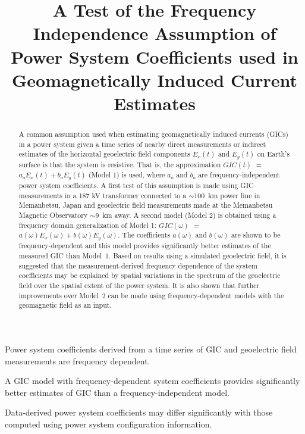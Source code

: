 \documentclass[draft,linenumbers]{agujournal2018}
\begin{document}
\title{A Test of the Frequency Independence Assumption of Power System Coefficients used in Geomagnetically Induced Current Estimates}





\begin{keypoints}
\item Power system coefficients derived from a time series of GIC and geoelectric field measurements are frequency dependent.
\item A GIC model with frequency-dependent system coefficients provides significantly better estimates of GIC than a frequency-independent model.
\item Data-derived power system coefficients may differ significantly with those computed using power system configuration information.
\end{keypoints}

\begin{abstract}
  A common assumption used when estimating geomagnetically induced currents (GICs) in a power system given a time series of nearby direct measurements or indirect estimates of the horizontal geoelectric field components $E_x(t)$ and $E_y(t)$ on Earth's surface is that the system is resistive. That is, the approximation $GIC(t)$  $=$ $a_oE_x(t) + b_oE_y(t)$ (Model 1) is used, where $a_o$ and $b_o$ are frequency-independent power system coefficients.  A first test of this assumption is made using GIC measurements in a 187 kV transformer connected to a $\sim$100~km power line in Memanbetsu, Japan and geoelectric field measurements made at the Memanbetsu Magnetic Observatory $\sim$9~km away. A second model (Model 2) is obtained using a frequency domain generalization of Model 1: $GIC(\omega)$ $=$ $a(\omega)E_x(\omega) + b(\omega)E_y(\omega)$. The coefficients $a(\omega)$ and $b(\omega)$ are shown to be frequency-dependent and this model provides significantly better estimates of the measured GIC than Model~1. Based on results using a simulated geoelectric field, it is suggested that the measurement-derived frequency dependence of the system coefficients may be explained by spatial variations in the spectrum of the geoelectric field over the spatial extent of the power system. It is also shown that further improvements over Model~2 can be made using frequency-dependent models with the geomagnetic field as an input.
\end{abstract}
\end{document}
